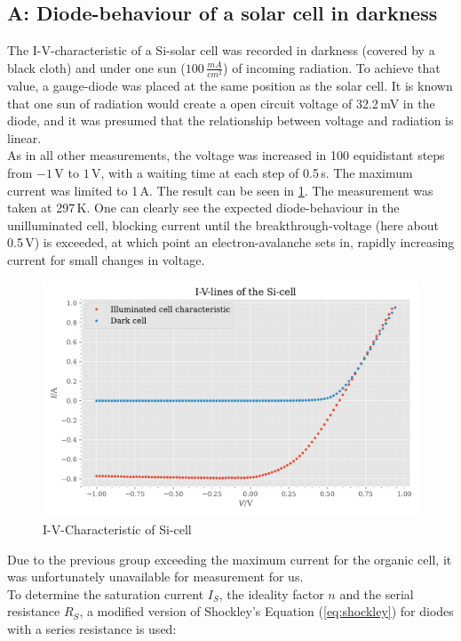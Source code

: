 \documentclass[english,  %
parskip=full,  %
headsepline]{scrartcl}
\begin{document}
\subsection{A: Diode-behaviour of a solar cell in darkness}\label{A}
The I-V-characteristic of a Si-solar cell was recorded in darkness (covered by a black cloth) and under one sun ($100\,\si{\frac{mA}{cm^2}}$) of incoming radiation. To achieve that value, a gauge-diode was placed at the same position as the solar cell. It is known that one sun of radiation would create a open circuit voltage of 32.2\,mV in the diode, and it was presumed that the relationship between voltage and radiation is linear. \\As in all other measurements, the voltage was increased in 100 equidistant steps from $-1\,$V to $1$\,V, with a waiting time at each step of 0.5\,s. The maximum current was limited to 1\,A. The result can be seen in \cref{fig:A}. The measurement was taken at 297\,K. One can clearly see the expected diode-behaviour in the unilluminated cell, blocking current until the breakthrough-voltage (here about 0.5\,V) is exceeded, at which point an electron-avalanche sets in, rapidly increasing current for small changes in voltage. 
\begin{figure}[H]
    \centering
    \includegraphics[width=\linewidth]{A.pdf}
    \caption{I-V-Characteristic of Si-cell}
    \label{fig:A}
\end{figure}
Due to the previous group exceeding the maximum current for the organic cell, it was unfortunately unavailable for measurement for us.\\
To determine the saturation current $I_S$, the ideality factor $n$ and the serial resistance $R_S$, a modified version of Shockley's Equation (\cref{eq:shockley}) for diodes with a series resistance is used:
\end{document}
